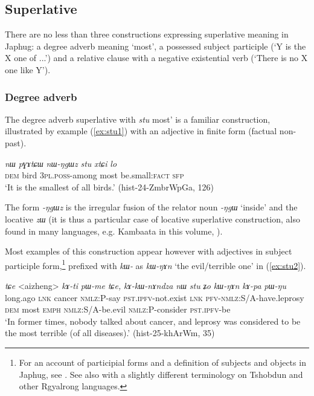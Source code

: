 \documentclass[oneside,a4paper,12pt]{article}
\newcommand{\ipa}[1]{{\phon\textit{#1}}}
\begin{document}
\subsection{Superlative}
There are no less than three constructions expressing superlative meaning in Japhug: a degree adverb meaning `most', a possessed subject participle (`Y is the X one of ...') and a relative clause with a negative existential verb (`There is no X one like Y').

 \subsubsection{Degree adverb}
 The degree adverb superlative with \ipa{stu}  most' is a familiar construction, illustrated by example (\ref{ex:stu1}) with an adjective in finite form (factual non-past).  
 
\begin{exe}
\ex \label{ex:stu1}
\gll 
\ipa{nɯ} 	\ipa{pɣɤtɕɯ} 	\ipa{nɯ-ŋgɯz} 	\ipa{stu} 	\ipa{xtɕi} 	\ipa{lo} \\
\textsc{dem} bird \textsc{3pl.poss-}among most be.small:\textsc{fact} \textsc{sfp} \\
\glt `It is the smallest of all birds.' (hist-24-ZmbrWpGa, 126)
\end{exe}

The form \ipa{-ŋgɯz} is the irregular fusion of the relator noun \ipa{-ŋgɯ} `inside' and the locative \ipa{zɯ} (it is thus a particular case of locative superlative construction, also found in many languages, e.g. Kambaata in this volume, \citealt{treis17comparison}). 

Most examples of this construction appear however with adjectives in subject participle form,\footnote{For an account of participial forms and a definition of subjects and objects in Japhug, see \citet{jacques16relatives, jacques16complementation}. See also \citet{jackson03caodeng, jackson14morpho} with a slightly different terminology on Tshobdun and other Rgyalrong languages.} prefixed with \ipa{kɯ-} as 	\ipa{kɯ-ŋɤn} `the evil/terrible one' in (\ref{ex:stu2}).

\begin{exe}
\ex \label{ex:stu2}
\gll \ipa{kɯɕɯŋgɯ} 	\ipa{tɕe} 	<aizheng> 	\ipa{kɤ-ti} 	\ipa{pɯ-me} 	\ipa{tɕe,} 	\ipa{kɤ-kɯ-nɤndza} 	\ipa{nɯ} 	\ipa{stu} 	\ipa{ʑo} 	\ipa{kɯ-ŋɤn} 	\ipa{kɤ-pa} 	\ipa{pɯ-ŋu} \\
long.ago \textsc{lnk} cancer \textsc{nmlz}:P-say \textsc{pst.ipfv}-not.exist \textsc{lnk} \textsc{pfv}-\textsc{nmlz}:S/A-have.leprosy \textsc{dem} most \textsc{emph} \textsc{nmlz}:S/A-be.evil \textsc{nmlz}:P-consider \textsc{pst.ipfv}-be \\
\glt `In former times, nobody talked about cancer, and leprosy was considered to be the most terrible (of all diseases).' (hist-25-khArWm, 35)
\end{exe}
\end{document}
